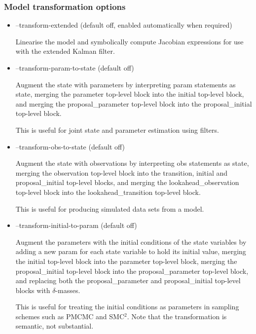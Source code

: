 \subsubsection{Model transformation options}
\begin{itemize}
\item {\sf --transform-extended} (default off, enabled automatically when
  required)

Linearise the model and symbolically compute Jacobian expressions for use with
the extended Kalman filter.

\item {\sf --transform-param-to-state} (default off)

Augment the state with parameters by interpreting {\sf param} statements as
{\sf state}, merging the {\sf parameter} top-level block into the {\sf
  initial} top-level block, and merging the {\sf proposal\_parameter}
top-level block into the {\sf proposal\_initial} top-level block.

This is useful for joint state and parameter estimation using filters.

\item {\sf --transform-obs-to-state} (default off)

Augment the state with observations by interpreting {\sf obs} statements as
{\sf state}, merging the {\sf observation} top-level block into the {\sf
  transition}, {\sf initial} and {\sf proposal\_initial} top-level blocks,
and merging the {\sf lookahead\_observation} top-level block into the
{\sf lookahead\_transition} top-level block.

This is useful for producing simulated data sets from a model.

\item {\sf --transform-initial-to-param} (default off)

Augment the parameters with the initial conditions of the state variables by
adding a new {\sf param} for each {\sf state} variable to hold its initial
value, merging the {\sf initial} top-level block into the {\sf parameter}
top-level block, merging the {\sf proposal\_initial} top-level block into the
{\sf proposal\_parameter} top-level block, and replacing both the {\sf
  proposal\_parameter} and {\sf proposal\_initial} top-level blocks with
$\delta$-masses.

This is useful for treating the initial conditions as parameters in sampling
schemes such as PMCMC and SMC$^2$. Note that the transformation is semantic,
not substantial.

\end{itemize}
